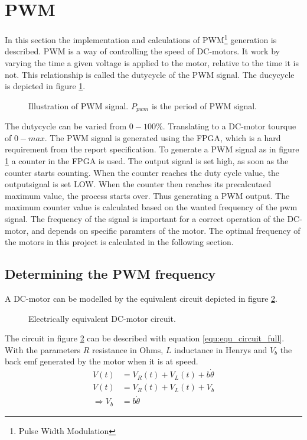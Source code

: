 \documentclass[../../Main]{subfiles}
\begin{document}
\section{PWM}
In this section the implementation and calculations of PWM\footnote{Pulse Width Modulation} generation is described. PWM is a way of controlling the speed of DC-motors. It work by varying the time a given voltage is applied to the motor, relative to the time it is not. This relationship is called the dutycycle of the PWM signal. The ducycycle is depicted in figure \ref{fig:pwm}.

\begin{figure}[h]
  
  \caption{Illustration of PWM signal. $P_{pwm}$ is the period of PWM signal.}
  \label{fig:pwm}
\end{figure}

The dutycycle can be varied from $0 - 100\%$. Translating to a DC-motor tourque of $0 - max$.
The PWM signal is generated using the FPGA, which is a hard requirement from the report specification. To generate a PWM signal as in figure \ref{fig:pwm} a counter in the FPGA  is used.
The output signal is set high, as soon as the counter starts counting. When the counter reaches the duty cycle value, the outputsignal is set LOW. When the counter then reaches its precalcutaed maximum value, the process starts over. Thus generating a PWM output. The maximum counter value is calculated based on the wanted frequency of the pwm signal. The frequency of the signal is important for a correct operation of the DC-motor, and depends on specific paramters of the motor. The optimal frequency of the motors in this project is calculated in the following section.
\newpage
\subsection*{Determining the PWM frequency}

A DC-motor can be modelled by the equivalent circuit depicted in figure \ref{fig:electrical_equ}.

\begin{figure}[ht]
	\center
	
	\caption{Electrically equivalent DC-motor circuit.}
  \label{fig:electrical_equ}
\end{figure}
The circuit in figure \ref{fig:electrical_equ} can be described with equation \ref{equ:equ_circuit_full}. With the parameters $R$ resistance in Ohms, $L$ inductance in Henrys and $V_b$ the back emf generated by the motor when it is at speed.
\begin{align}
	V(t) &= V_R(t) + V_L(t) + b\dot{\theta}\\
 \label{equ:equ_circuit_full}
	V(t) &= V_R(t) + V_L(t) + V_b\\
	\Rightarrow V_b &= b\dot{\theta}
\end{align}
\end{document}

